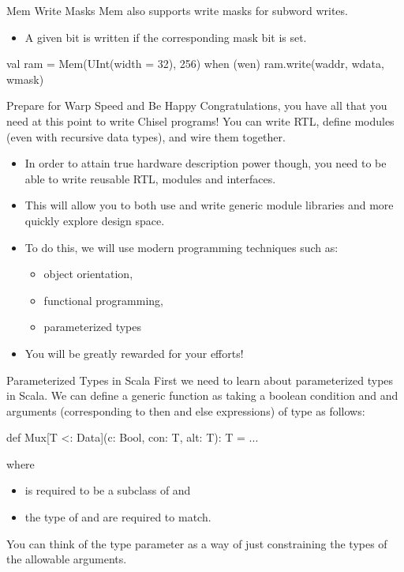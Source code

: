 \documentclass[xcolor=pdflatex,dvipsnames,table]{beamer}
\begin{document}
\begin{frame}[fragile]{Mem Write Masks }
Mem also supports write masks for subword writes. 
\begin{itemize}
\item A given bit is written if the corresponding mask bit is set.
\end{itemize}

\begin{scala}
val ram = Mem(UInt(width = 32), 256)
when (wen) { ram.write(waddr, wdata, wmask) }
\end{scala}

\end{frame}

\begin{frame}{Prepare for Warp Speed and Be Happy}
Congratulations, you have all that you need at this point to write Chisel programs!
You can write RTL, define modules (even with recursive data types), and wire them together.
\vspace{5mm}
\begin{itemize}
\item In order to attain true hardware description power though, you need to be able to write reusable RTL, modules and interfaces.
\item This will allow you to both use and write generic module libraries and more quickly explore design space.
\item To do this, we will use modern programming techniques such as:
\begin{itemize}
\item object orientation, 
\item functional programming, 
\item parameterized types
\end{itemize}
\item You will be greatly rewarded for your efforts!
\end{itemize}

\end{frame}

\begin{frame}[fragile]{Parameterized Types in Scala}
First we need to learn about parameterized types in Scala.
We can define a generic  function as taking a boolean condition and  and  arguments (corresponding to then and else expressions) of type  as follows:

\begin{scala}
def Mux[T <: Data](c: Bool, con: T, alt: T): T = ...
\end{scala}

\noindent
where 
\begin{itemize}
\item {} is required to be a subclass of  and 
\item the type of  and  are required to match.
\end{itemize}

\noindent
You can think of the type parameter as a way of just constraining the types of the allowable arguments.

\end{frame}
\end{document}
